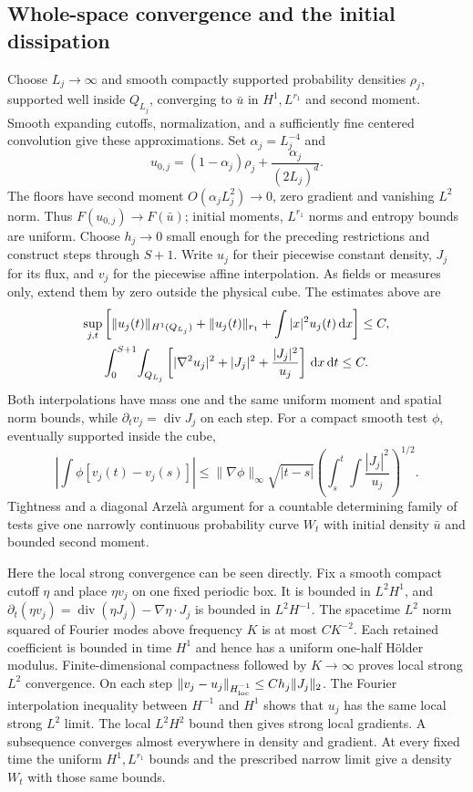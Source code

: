 \documentclass[11pt]{article}
\numberwithin{equation}{section}
\theoremstyle{definition}
\theoremstyle{remark}
\newcommand{\dd}{\,\mathrm d}
\newcommand{\Div}{\operatorname{div}}
\newcommand{\norm}[1]{\lVert #1\rVert}
\begin{document}
\subsection{Whole-space convergence and the initial dissipation}
Choose $L_j\to\infty$ and smooth compactly supported probability densities
$\rho_j$, supported well inside $Q_{L_j}$, converging to $\bar u$ in
$H^1,L^{r_1}$ and second moment. Smooth expanding cutoffs, normalization,
and a sufficiently fine centered convolution give these approximations.
Set $\alpha_j=L_j^{-4}$ and
\[
 u_{0,j}=(1-\alpha_j)\rho_j+\frac{\alpha_j}{(2L_j)^d}.
\]
The floors have second moment $O(\alpha_jL_j^2)\to0$, zero gradient and
vanishing $L^2$ norm. Thus $F(u_{0,j})\to F(\bar u)$; initial moments,
$L^{r_1}$ norms and entropy bounds are uniform.
Choose $h_j\to0$ small enough for the preceding restrictions and construct
steps through $S+1$. Write $u_j$ for their piecewise constant density,
$J_j$ for its flux, and $v_j$ for the piecewise affine interpolation.
As fields or measures only, extend them by zero outside the physical cube.
The estimates above are
\begin{gather}
 \sup_{j,t}\left[\norm{u_j(t)}_{H^1(Q_{L_j})}
      +\norm{u_j(t)}_{r_1}+\int|x|^2u_j(t)\dd x\right]\le C,\notag\\
 \int_0^{S+1}\!\int_{Q_{L_j}}
    \left[|\nabla^2u_j|^2+|J_j|^2+\frac{|J_j|^2}{u_j}\right]\dd x\dd t
       \le C.\label{eq:approx-bounds}
\end{gather}
Both interpolations have mass one and the same uniform moment and spatial
norm bounds, while $\partial_t v_j=\Div J_j$ on each step.
For a compact smooth test $\phi$, eventually supported inside the cube,
\[
 \left|\int\phi[v_j(t)-v_j(s)]\right|
 \le\norm{\nabla\phi}_\infty\sqrt{|t-s|}
                 \left(\int_s^t\!\int\frac{|J_j|^2}{u_j}\right)^{1/2}.
\]
Tightness and a diagonal Arzel\`a argument for a countable determining
family of tests give one narrowly continuous probability curve $W_t$ with
initial density $\bar u$ and bounded second moment.

Here the local strong convergence can be seen directly. Fix a smooth
compact cutoff $\eta$ and place $\eta v_j$ on one fixed periodic box.
It is bounded in $L^2H^1$, and
$\partial_t(\eta v_j)=\Div(\eta J_j)-\nabla\eta\cdot J_j$
is bounded in $L^2H^{-1}$. The spacetime $L^2$ norm squared of Fourier
modes above frequency $K$ is at most $CK^{-2}$. Each retained coefficient
is bounded in time $H^1$ and hence has a uniform one-half H\"older modulus.
Finite-dimensional compactness followed by $K\to\infty$ proves local
strong $L^2$ convergence. On each step
$\norm{v_j-u_j}_{H^{-1}_{\rm loc}}\le Ch_j\norm{J_j}_2$.
The Fourier interpolation inequality between $H^{-1}$ and $H^1$ shows
that $u_j$ has the same local strong $L^2$ limit. The local $L^2H^2$
bound then gives strong local gradients. A subsequence converges almost
everywhere in density and gradient. At every fixed time the uniform
$H^1,L^{r_1}$ bounds and the prescribed narrow limit give a density $W_t$
with those same bounds.
\end{document}

